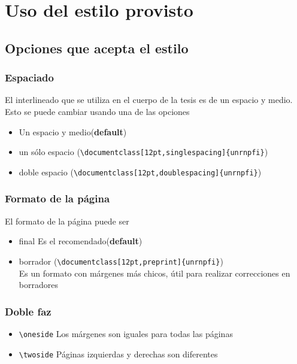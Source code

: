 \chapter{Uso del estilo provisto}

\section{Opciones que acepta el estilo}
\label{S:opciones-que-acepta}

\subsection*{Espaciado}
El interlineado que se utiliza en el cuerpo de la tesis es de un espacio y medio. Esto se puede cambiar usando una de las opciones
\begin{itemize}
\item Un espacio y medio(\textbf{default})
\item un s\'{o}lo espacio (\verb|\documentclass[12pt,singlespacing]{unrnpfi}|)
\item doble espacio (\verb|\documentclass[12pt,doublespacing]{unrnpfi}|)
\end{itemize}

\subsection*{Formato de la p\'{a}gina}
El formato de la p\'{a}gina puede ser
\begin{itemize}
\item final Es el recomendado(\textbf{default})
\item borrador (\verb|\documentclass[12pt,preprint]{unrnpfi}|)\\ Es un formato con m\'{a}rgenes m\'{a}s chicos, \'{u}til para realizar correcciones en borradores 
\end{itemize}

\subsection*{Doble faz}
\label{S:doble-faz}

\begin{itemize}
\item \verb|\oneside| Los m\'{a}rgenes son iguales para todas las p\'{a}ginas
\item \verb|\twoside| P\'{a}ginas izquierdas y derechas son diferentes
\end{itemize}


